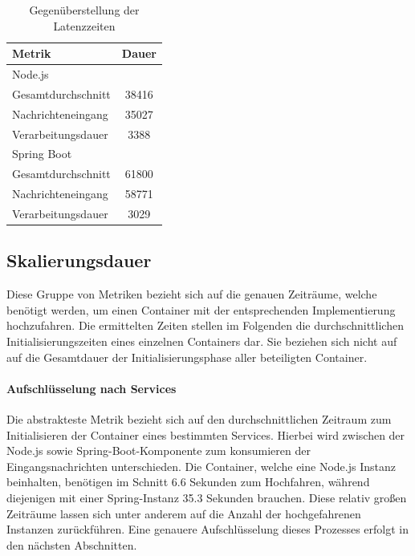 \begin{table}[ht!]
	\centering
	\caption[Latenzzeit - Vergleich]{Gegenüberstellung der Latenzzeiten}
  \label{tab:latency}
  \hspace{5mm}
  \begin{tabular}{@{}lc@{}}
    \toprule
    Metrik & Dauer \\
    \midrule
    Node.js \\
    \hspace{3mm}Gesamtdurchschnitt & 38416 \\
    \hspace{3mm}Nachrichteneingang & 35027 \\
    \hspace{3mm}Verarbeitungsdauer & 3388 \\
    \midrule
    Spring Boot \\
    \hspace{3mm}Gesamtdurchschnitt & 61800 \\
    \hspace{3mm}Nachrichteneingang & 58771 \\
    \hspace{3mm}Verarbeitungsdauer & 3029 \\
    \bottomrule
  \end{tabular}
\end{table}


\subsection{Skalierungsdauer}
Diese Gruppe von Metriken bezieht sich auf die genauen Zeiträume, welche benötigt werden, um einen Container mit der entsprechenden Implementierung hochzufahren. Die ermittelten Zeiten stellen im Folgenden die durchschnittlichen Initialisierungszeiten eines einzelnen Containers dar. Sie beziehen sich nicht auf auf die Gesamtdauer der Initialisierungsphase aller beteiligten Container.

\paragraph{Aufschlüsselung nach Services}
Die abstrakteste Metrik bezieht sich auf den durchschnittlichen Zeitraum zum Initialisieren der Container eines bestimmten Services. Hierbei wird zwischen der Node.js sowie Spring-Boot-Komponente zum konsumieren der Eingangsnachrichten unterschieden. Die Container, welche eine Node.js Instanz beinhalten, benötigen im Schnitt 6.6 Sekunden zum Hochfahren, während diejenigen mit einer Spring-Instanz 35.3 Sekunden brauchen. Diese relativ großen Zeiträume lassen sich unter anderem auf die Anzahl der hochgefahrenen Instanzen zurückführen. Eine genauere Aufschlüsselung dieses Prozesses erfolgt in den nächsten Abschnitten. 


